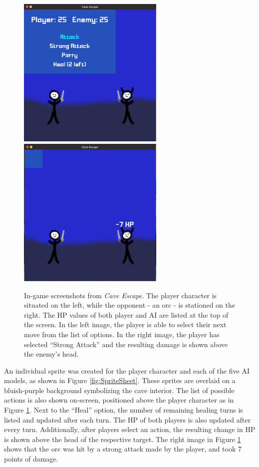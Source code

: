 \begin{figure}[H]
  \centering
  \includegraphics[width=7cm]{figures/In-Game.png}
  \includegraphics[width=7cm]{figures/In-Game2.png}
  \caption{In-game screenshots from \textit{Cave Escape}. The player character is situated on the left, while the opponent - an orc - is stationed on the right. The HP values of both player and AI are listed at the top of the screen. In the left image, the player is able to select their next move from the list of options. In the right image, the player has selected ``Strong Attack'' and the resulting damage is shown above the enemy's head.}
  \label{fig:ingame}
\end{figure}

An individual sprite was created for the player character and each of the five AI models, as shown in Figure \ref{fig:SpriteSheet}. These sprites are overlaid on a bluish-purple background symbolizing the cave interior. The list of possible actions is also shown on-screen, positioned above the player character as in Figure \ref{fig:ingame}. Next to the ``Heal'' option, the number of remaining healing turns is listed and updated after each turn. The HP of both players is also updated after every turn. Additionally, after players select an action, the resulting change in HP is shown above the head of the respective target. The right image in Figure \ref{fig:ingame} shows that the orc was hit by a strong attack made by the player, and took 7 points of damage.\\

